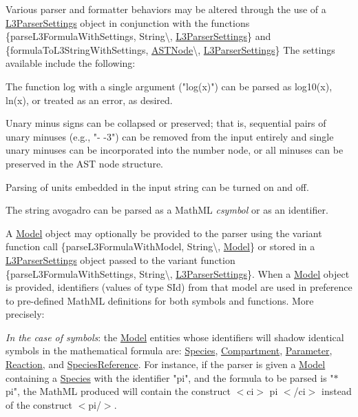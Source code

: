 \begin{DoxyItemize}
\item Various parser and formatter behaviors may be altered through the use of a \hyperlink{class_l3_parser_settings}{L3\+Parser\+Settings} object in conjunction with the functions \{parse\+L3\+Formula\+With\+Settings, String\textbackslash{}, \hyperlink{class_l3_parser_settings}{L3\+Parser\+Settings}\} and \{formula\+To\+L3\+String\+With\+Settings, \hyperlink{class_a_s_t_node}{A\+S\+T\+Node}\textbackslash{}, \hyperlink{class_l3_parser_settings}{L3\+Parser\+Settings}\} The settings available include the following\+: 
\begin{DoxyItemize}
\item The function {\ttfamily log} with a single argument ("{\ttfamily log(x)}") can be parsed as {\ttfamily log10(x)}, {\ttfamily ln(x)}, or treated as an error, as desired.


\item Unary minus signs can be collapsed or preserved; that is, sequential pairs of unary minuses (e.\+g., "{\ttfamily -\/ -\/3}") can be removed from the input entirely and single unary minuses can be incorporated into the number node, or all minuses can be preserved in the A\+ST node structure.


\item Parsing of units embedded in the input string can be turned on and off.


\item The string {\ttfamily avogadro} can be parsed as a Math\+ML {\itshape csymbol} or as an identifier.


\item A \hyperlink{class_model}{Model} object may optionally be provided to the parser using the variant function call \{parse\+L3\+Formula\+With\+Model, String\textbackslash{}, \hyperlink{class_model}{Model}\} or stored in a \hyperlink{class_l3_parser_settings}{L3\+Parser\+Settings} object passed to the variant function \{parse\+L3\+Formula\+With\+Settings, String\textbackslash{}, \hyperlink{class_l3_parser_settings}{L3\+Parser\+Settings}\}. When a \hyperlink{class_model}{Model} object is provided, identifiers (values of type {\ttfamily S\+Id}) from that model are used in preference to pre-\/defined Math\+ML definitions for both symbols and functions. More precisely\+: 
\begin{DoxyItemize}
\item {\itshape In the case of symbols}\+: the \hyperlink{class_model}{Model} entities whose identifiers will shadow identical symbols in the mathematical formula are\+: \hyperlink{class_species}{Species}, \hyperlink{class_compartment}{Compartment}, \hyperlink{class_parameter}{Parameter}, \hyperlink{class_reaction}{Reaction}, and \hyperlink{class_species_reference}{Species\+Reference}. For instance, if the parser is given a \hyperlink{class_model}{Model} containing a \hyperlink{class_species}{Species} with the identifier "{\ttfamily pi}", and the formula to be parsed is "{$\ast$pi}", the Math\+ML produced will contain the construct {\ttfamily $<$ci$>$ pi $<$/ci$>$} instead of the construct {\ttfamily $<$pi/$>$}.



\end{DoxyItemize}
\end{DoxyItemize}
\end{DoxyItemize}

